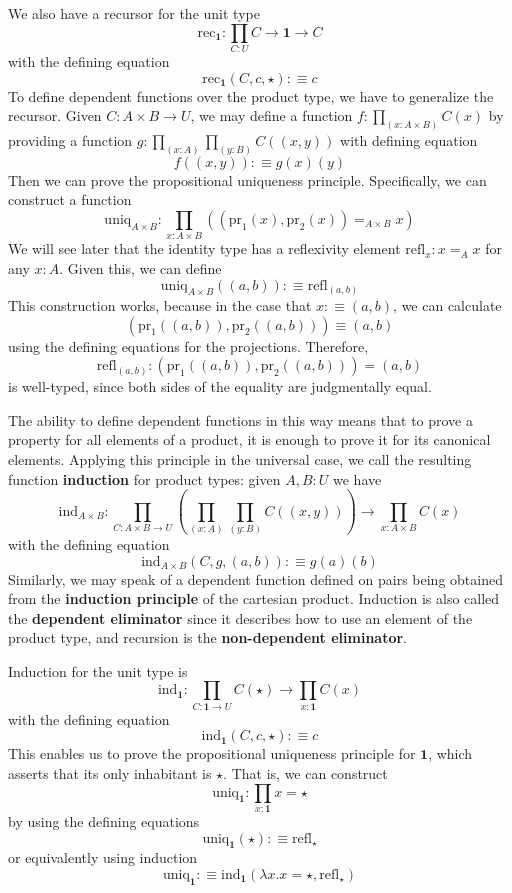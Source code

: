 We also have a recursor for the unit type \begin{equation*}
    \text{rec}_{\mathbf{1}}:\prod_{C:U}C\rightarrow \mathbf{1}\rightarrow C
\end{equation*}
with the defining equation \begin{equation*}
    \text{rec}_{\mathbf{1}}(C,c,\star) :\equiv c
\end{equation*}
To define dependent functions over the product type, we have to generalize the recursor. Given $C:A\times B\rightarrow U$, we may define a function $f:\prod_{(x:A\times B)}C(x)$ by providing a function $g:\prod_{(x:A)}\prod_{(y:B)}C((x,y))$ with defining equation $$f((x,y)) :\equiv g(x)(y)$$
Then we can prove the propositional uniqueness principle. Specifically, we can construct a function \begin{equation*}
    \text{uniq}_{A\times B}:\prod_{x:A\times B}((\text{pr}_1(x),\text{pr}_2(x)) =_{A\times B}x)
\end{equation*}
We will see later that the identity type has a reflexivity element $\text{refl}_x:x=_Ax$ for any $x:A$. Given this, we can define $$\text{uniq}_{A\times B}((a,b)) :\equiv \text{refl}_{(a,b)}$$
This construction works, because in the case that $x:\equiv (a,b)$, we can calculate $$(\text{pr}_1((a,b)),\text{pr}_2((a,b))) \equiv (a,b)$$
using the defining equations for the projections. Therefore, $$\text{refl}_{(a,b)}:(\text{pr}_1((a,b)),\text{pr}_2((a,b))) = (a,b)$$
is well-typed, since both sides of the equality are judgmentally equal.

The ability to define dependent functions in this way means that to prove a property for all elements of a product, it is enough to prove it for its canonical elements. Applying this principle in the universal case, we call the resulting function \textbf{induction} for product types: given $A,B:U$ we have $$\text{ind}_{A\times B}:\prod_{C:A\times B\rightarrow U}\left(\prod_{(x:A)}\prod_{(y:B)}C((x,y))\right)\rightarrow \prod_{x:A\times B}C(x)$$
with the defining equation $$\text{ind}_{A\times B}(C,g,(a,b)) :\equiv g(a)(b)$$
Similarly, we may speak of a dependent function defined on pairs being obtained from the \textbf{induction principle} of the cartesian product. Induction is also called the \textbf{dependent eliminator} since it describes how to use an element of the product type, and recursion is the \textbf{non-dependent eliminator}.

Induction for the unit type is \begin{equation*}
    \text{ind}_{\mathbf{1}}:\prod_{C:\mathbf{1}\rightarrow U}C(\star)\rightarrow \prod_{x:\mathbf{1}}C(x)
\end{equation*}
with the defining equation $$\text{ind}_{\mathbf{1}}(C,c,\star) :\equiv c$$
This enables us to prove the propositional uniqueness principle for $\mathbf{1}$, which asserts that its only inhabitant is $\star$. That is, we can construct $$\text{uniq}_{\mathbf{1}}:\prod_{x:\mathbf{1}}x=\star$$
by using the defining equations $$\text{uniq}_{\mathbf{1}}(\star):\equiv \text{refl}_{\star}$$
or equivalently using induction $$\text{uniq}_{\mathbf{1}} :\equiv \text{ind}_{\mathbf{1}}(\lambda x.x = \star,\text{refl}_{\star})$$


